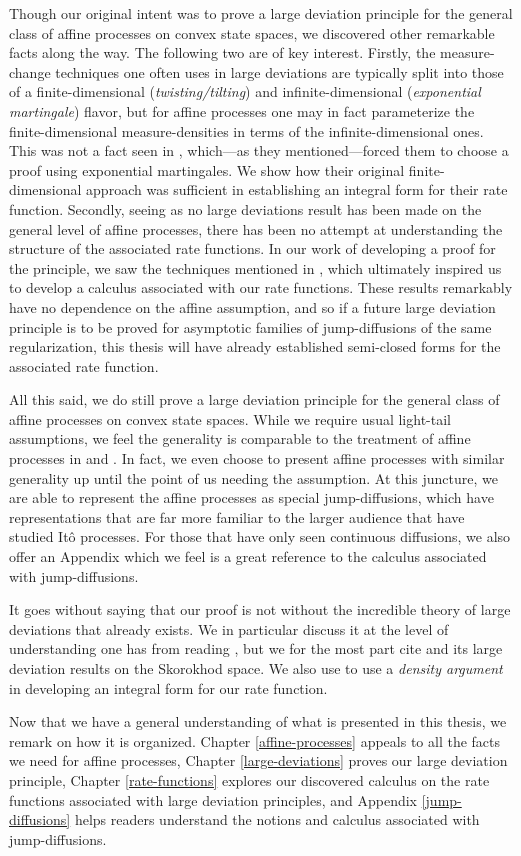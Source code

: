 Though our original intent was to prove a large deviation principle for the general class of affine processes on convex state spaces, we discovered other remarkable facts along the way.
The following two are of key interest.
Firstly, the measure-change techniques one often uses in large deviations are typically split into those of a finite-dimensional (\emph{twisting/tilting}) and infinite-dimensional (\emph{exponential martingale}) flavor, but for affine processes one may in fact parameterize the finite-dimensional measure-densities in terms of the infinite-dimensional ones.
This was not a fact seen in \cite{kang2014}, which---as they mentioned---forced them to choose a proof using exponential martingales.
We show how their original finite-dimensional approach was sufficient in establishing an integral form for their rate function.
Secondly, seeing as no large deviations result has been made on the general level of affine processes, there has been no attempt at understanding the structure of the associated rate functions.
In our work of developing a proof for the principle, we saw the techniques mentioned in \cite{duffy2004}, which ultimately inspired us to develop a calculus associated with our rate functions.
These results remarkably have no dependence on the affine assumption, and so if a future large deviation principle is to be proved for asymptotic families of jump-diffusions of the same regularization, this thesis will have already established semi-closed forms for the associated rate function.

All this said, we do still prove a large deviation principle for the general class of affine processes on convex state spaces.
While we require usual light-tail assumptions, we feel the generality is comparable to the treatment of affine processes in \cite{cuchiero2011} and \cite{keller2015}.
In fact, we even choose to present affine processes with similar generality up until the point of us needing the assumption.
At this juncture, we are able to represent the affine processes as special jump-diffusions, which have representations that are far more familiar to the larger audience that have studied It\^o processes.
For those that have only seen continuous diffusions, we also offer an Appendix which we feel is a great reference to the calculus associated with jump-diffusions.

It goes without saying that our proof is not without the incredible theory of large deviations that already exists.
We in particular discuss it at the level of understanding one has from reading \cite{dembo2010}, but we for the most part cite \cite{feng2006} and its large deviation results on the Skorokhod space.
We also use \cite{puhalskii2001} to use a \emph{density argument} in developing an integral form for our rate function.

Now that we have a general understanding of what is presented in this thesis, we remark on how it is organized.
Chapter \ref{affine-processes} appeals to all the facts we need for affine processes, Chapter \ref{large-deviations} proves our large deviation principle, Chapter \ref{rate-functions} explores our discovered calculus on the rate functions associated with large deviation principles, and Appendix \ref{jump-diffusions} helps readers understand the notions and calculus associated with jump-diffusions.
